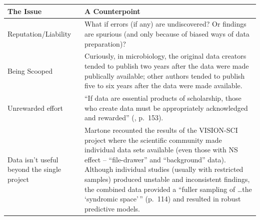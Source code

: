 \documentclass[
  english,
]{book}
\begin{document}
\begin{longtable}[]{@{}ll@{}}
\toprule
\begin{minipage}[b]{0.17\columnwidth}\raggedright
The Issue\strut
\end{minipage} & \begin{minipage}[b]{0.77\columnwidth}\raggedright
A Counterpoint\strut
\end{minipage}\tabularnewline
\midrule
\endhead
\begin{minipage}[t]{0.17\columnwidth}\raggedright
Reputation/Liability\strut
\end{minipage} & \begin{minipage}[t]{0.77\columnwidth}\raggedright
What if errors (if any) are undiscovered? Or findings are spurious (and only because of biased ways of data preparation)?\strut
\end{minipage}\tabularnewline
\begin{minipage}[t]{0.17\columnwidth}\raggedright
Being Scooped\strut
\end{minipage} & \begin{minipage}[t]{0.77\columnwidth}\raggedright
Curiously, in microbiology, the original data creators tended to publish two years after the data were made publically available; other authors tended to publish five to six years after the data were made available.\strut
\end{minipage}\tabularnewline
\begin{minipage}[t]{0.17\columnwidth}\raggedright
Unrewarded effort\strut
\end{minipage} & \begin{minipage}[t]{0.77\columnwidth}\raggedright
``If data are essential products of scholarship, those who create data must be appropriately acknowledged and rewarded'' (\citep{alter_responsible_2018}, p.~153).\strut
\end{minipage}\tabularnewline
\begin{minipage}[t]{0.17\columnwidth}\raggedright
Data isn't useful beyond the single project\strut
\end{minipage} & \begin{minipage}[t]{0.77\columnwidth}\raggedright
Martone \citep{martone_data_2018} recounted the results of the VISION-SCI project where the scientific community made individual data sets available (even those with NS effect -- ``file-drawer'' and ``background'' data). Although individual studies (usually with restricted samples) produced unstable and inconsistent findings, the combined data provided a ``fuller sampling of \ldots the `syndromic space'\,'' (p.~114) and resulted in robust predictive models.\strut

\end{minipage}
\end{longtable}
\end{document}
